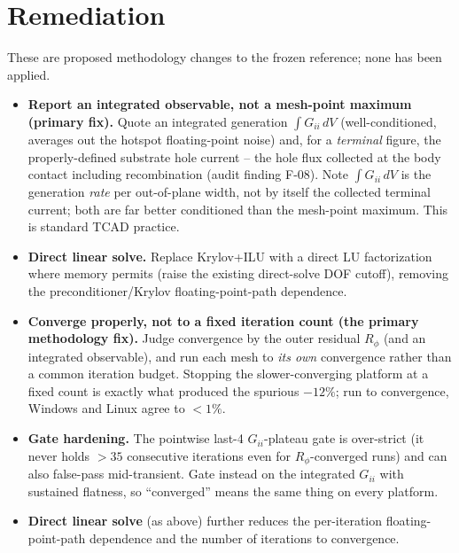 \documentclass[11pt]{article}
\begin{document}
\section{Remediation}
These are proposed methodology changes to the frozen reference; none has been applied.
\begin{itemize}[nosep]
\item \textbf{Report an integrated observable, not a mesh-point maximum (primary fix).} Quote an integrated generation $\int G_{ii}\,dV$ (well-conditioned, averages out the hotspot floating-point noise) and, for a \emph{terminal} figure, the properly-defined substrate hole current -- the hole flux collected at the body contact including recombination (audit finding F-08). Note $\int G_{ii}\,dV$ is the generation \emph{rate} per out-of-plane width, not by itself the collected terminal current; both are far better conditioned than the mesh-point maximum. This is standard TCAD practice.
\item \textbf{Direct linear solve.} Replace Krylov+ILU with a direct LU factorization where memory permits (raise the existing direct-solve DOF cutoff), removing the preconditioner/Krylov floating-point-path dependence.
\item \textbf{Converge properly, not to a fixed iteration count (the primary methodology fix).} Judge convergence by the outer residual $R_\phi$ (and an integrated observable), and run each mesh to \emph{its own} convergence rather than a common iteration budget. Stopping the slower-converging platform at a fixed count is exactly what produced the spurious $-12\%$; run to convergence, Windows and Linux agree to $<1\%$.
\item \textbf{Gate hardening.} The pointwise last-4 $G_{ii}$-plateau gate is over-strict (it never holds $>35$ consecutive iterations even for $R_\phi$-converged runs) and can also false-pass mid-transient. Gate instead on the integrated $G_{ii}$ with sustained flatness, so ``converged'' means the same thing on every platform.
\item \textbf{Direct linear solve} (as above) further reduces the per-iteration floating-point-path dependence and the number of iterations to convergence.
\end{itemize}
\end{document}
